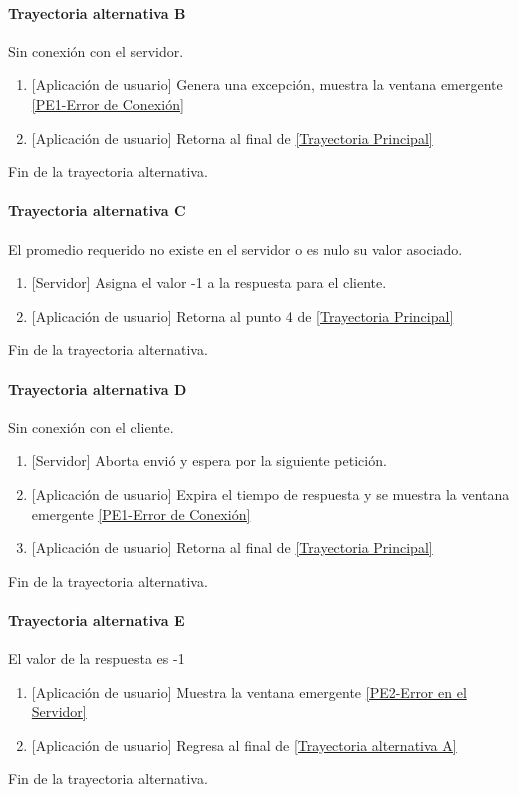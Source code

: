 \paragraph{Trayectoria alternativa B} \label{SUB-U-CU1.6:TB}
	Sin conexión con el servidor.
	\begin{enumerate}[label=B\arabic*.]
		\item {[Aplicación de usuario]} Genera una excepción, muestra la ventana emergente \hyperref[fig:Error de Conexion]{[PE1-Error de Conexión]}
		\item {[Aplicación de usuario]} Retorna al final de \hyperref[SUB-U-CU1.6:TP]{[Trayectoria Principal]} 
	\end{enumerate}
	Fin de la trayectoria alternativa.

\paragraph{Trayectoria alternativa C} \label{SUB-U-CU1.6:TC}
	El promedio requerido no existe en el servidor o es nulo su valor asociado.
	\begin{enumerate}[label=C\arabic*.]
		\item {[Servidor]} Asigna el valor -1 a la respuesta para el cliente.
		\item {[Aplicación de usuario]} Retorna al punto 4 de \hyperref[SUB-U-CU1.6:TP]{[Trayectoria Principal]}
	\end{enumerate}
	Fin de la trayectoria alternativa.

\paragraph{Trayectoria alternativa D} \label{SUB-U-CU1.6:TD}
	Sin conexión con el cliente.
	\begin{enumerate}[label=D\arabic*.]
		\item {[Servidor]} Aborta envió y espera por la siguiente petición.
		\item {[Aplicación de usuario]} Expira el tiempo de respuesta y se muestra la ventana emergente \hyperref[fig:Error de Conexion]{[PE1-Error de Conexión]}
		\item {[Aplicación de usuario]} Retorna al final de \hyperref[SUB-U-CU1.6:TP]{[Trayectoria Principal]} 
	\end{enumerate}
	Fin de la trayectoria alternativa.
	
\paragraph{Trayectoria alternativa E} \label{SUB-U-CU1.6:TE}
	El valor de la respuesta es -1
	\begin{enumerate}[label=E\arabic*.]
		\item {[Aplicación de usuario]} Muestra la ventana emergente \hyperref[fig:Error en el Servidor]{[PE2-Error en el Servidor]}
		\item {[Aplicación de usuario]} Regresa al final de \hyperref[SUB-U-CU1.6:TA]{[Trayectoria alternativa A]}
	\end{enumerate}
	Fin de la trayectoria alternativa.